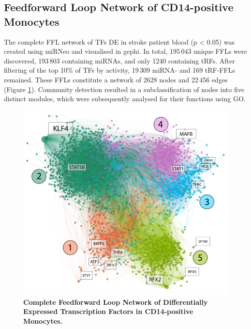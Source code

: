 \subsection{Feedforward Loop Network of CD14-positive Monocytes}
The complete FFL network of TFs DE in stroke patient blood (p < 0.05) was created using miRNeo and visualised in gephi. In total, 195\,043 unique FFLs were discovered, 193\,803 containing miRNAs, and only 1240 containing tRFs. After filtering of the top 10\% of TFs by activity, 19\,309 miRNA- and 169 tRF-FFLs remained. These FFLs constitute a network of 2628 nodes and 22\,456 edges (Figure \ref{fig:cd14-ffl-modules}). Community detection\cite{Blondel2008} resulted in a subclassification of nodes into five distinct modules, which were subsequently analysed for their functions using GO.

\begin{figure}
\includegraphics[width=\textwidth]{figures/cd14-ffl-modules}
\caption[Complete Feedforward Loop Network of Differentially Expressed Transcription Factors in CD14-positive Monocytes.]{\textbf{Complete Feedforward Loop Network of Differentially Expressed Transcription Factors in CD14-positive Monocytes.} 
\label{fig:cd14-ffl-modules}}
\end{figure}



